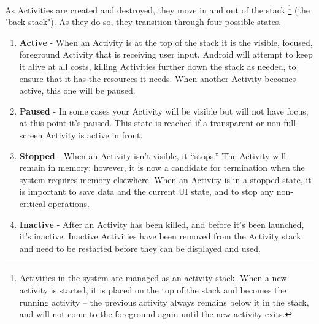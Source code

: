 As Activities are created and destroyed, they move in and out of the stack \footnote{Activities in the system are managed as an activity stack.
When a new activity is started, it is placed on the top of the stack and becomes the running activity -- the previous activity always remains below it in the stack, and will not come to the foreground again until the new activity exits.} (the "back stack").
As they do so, they transition through four possible states.

\begin{enumerate}
	\item \textbf{Active} - When an Activity is at the top of the stack it is the visible, focused, foreground Activity that is receiving user input.
		Android will attempt to keep it alive at all costs, killing Activities further down the stack as needed, to ensure that it has the resources it needs.
		When another Activity becomes active, this one will be paused.
	\item \textbf{Paused} - In some cases your Activity will be visible but will not have focus; at this point it’s paused.
		This state is reached if a transparent or non-full-screen Activity is active in front.
	\item \textbf{Stopped} - When an Activity isn’t visible, it “stops.” 
		The Activity will remain in memory; however, it is now a candidate for termination when the system requires memory elsewhere.
		When an Activity is in a stopped state, it is important to save data and the current UI state, and to stop any non-critical operations.
	\item \textbf{Inactive} - After an Activity has been killed, and before it’s been launched, it’s inactive.
		Inactive Activities have been removed from the Activity stack and need to be restarted before they can be displayed and used.
\end{enumerate}

